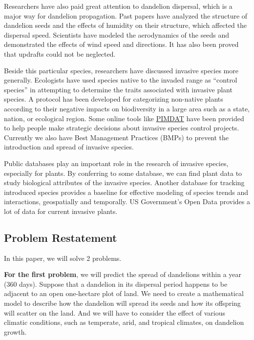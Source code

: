 \documentclass[12pt]{article}
\begin{document}
	Researchers have also paid great attention to dandelion dispersal, which is a major way for dandelion propagation.  Past papers have analyzed the structure of dandelion seeds and the effects of humidity on their structure, which affected the dispersal speed\autocite{greene1989model}. Scientists have modeled the aerodynamics of the seeds and demonstrated the effects of wind speed and directions.  It has also been proved that updrafts could not be neglected\autocite{tackenberg2003dandelion}.
	
	Beside this particular species, researchers have discussed invasive species more generally.  Ecologists have used species native to the invaded range as ``control species'' in attempting to determine the traits associated with invasive plant species\autocite{muth2006traits}.  A protocol has been developed for categorizing non-native plants according to their negative impacts on biodiversity in a large area such as a state, nation, or ecological region\autocite{randall2008invasive}.  Some online tools like \href{https://www.imapinvasives.org/decision-analysis-tool}{PIMDAT}\autocite{PIMDAT} have been provided to help people make strategic decisions about invasive species control projects.  Currently we also have Best Management Practices (BMPs) to prevent the introduction and spread of invasive species\autocite{BMP}.
	
	Public databases play an important role in the research of invasive species, especially for plants. By conferring to some database, we can find plant data to study biological attributes of the invasive species\autocite{USDA}.  Another database for tracking introduced species provides a baseline for effective modeling of species trends and interactions, geospatially and temporally\autocite{US-RIIS}.  US Government's Open Data provides a lot of data for current invasive plants\autocite{DATAGOV}.
	\newpage
	
	\subsection{Problem Restatement}

	In this paper, we will solve 2 problems.
	
	\textbf{For the first problem}, we will predict the spread of dandelions within a year (360 days).  Suppose that a dandelion in its dispersal period happens to be adjacent to an open one-hectare plot of land.  We need to create a mathematical model to describe how the dandelion will spread its seeds and how its offspring will scatter on the land.  And we will have to consider the effect of various climatic conditions, such as temperate, arid, and tropical climates, on dandelion growth.
	
\end{document}
